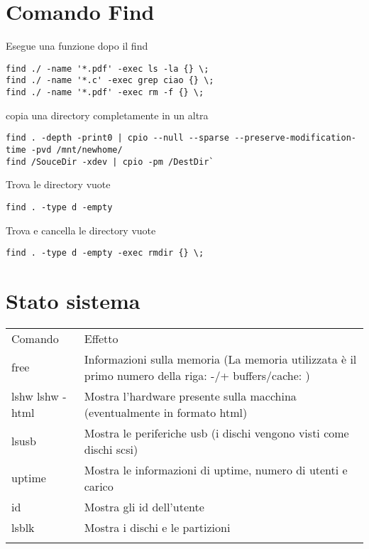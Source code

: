 \documentclass[]{article}
\begin{document}
\section{Comando Find}\label{comando-find}

Esegue una funzione dopo il find

\begin{verbatim}
find ./ -name '*.pdf' -exec ls -la {} \;     
find ./ -name '*.c' -exec grep ciao {} \;
find ./ -name '*.pdf' -exec rm -f {} \;
\end{verbatim}

copia una directory completamente in un altra

\begin{verbatim}
find . -depth -print0 | cpio --null --sparse --preserve-modification-time -pvd /mnt/newhome/
find /SouceDir -xdev | cpio -pm /DestDir`  
\end{verbatim}

Trova le directory vuote

\begin{verbatim}
find . -type d -empty
\end{verbatim}

Trova e cancella le directory vuote

\begin{verbatim}
find . -type d -empty -exec rmdir {} \;
\end{verbatim}

\section{Stato sistema}\label{stato-sistema}

\begin{longtable}[l]{@{}ll@{}}
\toprule\addlinespace
Comando & Effetto
\\\addlinespace
\midrule\endhead
free & Informazioni sulla memoria (La memoria utilizzata è il primo
numero della riga: -/+ buffers/cache: )
\\\addlinespace
lshw lshw -html & Mostra l'hardware presente sulla macchina
(eventualmente in formato html)
\\\addlinespace
lsusb & Mostra le periferiche usb (i dischi vengono visti come dischi
scsi)
\\\addlinespace
uptime & Mostra le informazioni di uptime, numero di utenti e carico
\\\addlinespace
id & Mostra gli id dell'utente
\\\addlinespace
lsblk & Mostra i dischi e le partizioni
\\\addlinespace
\bottomrule
\end{longtable}
\end{document}
